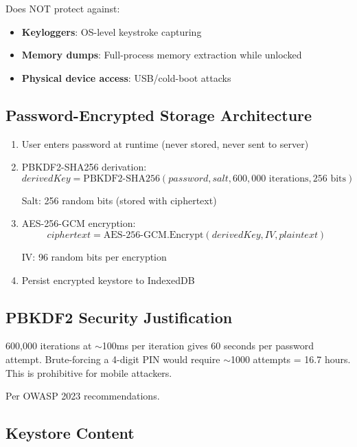 \documentclass[11pt,a4paper,oneside]{article}
\begin{document}
Does NOT protect against:
\begin{itemize}
\item \textbf{Keyloggers}: OS-level keystroke capturing
\item \textbf{Memory dumps}: Full-process memory extraction while unlocked
\item \textbf{Physical device access}: USB/cold-boot attacks
\end{itemize}

\subsection{Password-Encrypted Storage Architecture}

\begin{enumerate}
\item User enters password at runtime (never stored, never sent to server)

\item PBKDF2-SHA256 derivation:
\begin{equation}
derivedKey = \text{PBKDF2-SHA256}(password, salt, 600{,}000\text{ iterations}, 256\text{ bits})
\end{equation}

Salt: 256 random bits (stored with ciphertext)

\item AES-256-GCM encryption:
\begin{equation}
ciphertext = \text{AES-256-GCM.Encrypt}(derivedKey, IV, plaintext)
\end{equation}

IV: 96 random bits per encryption

\item Persist encrypted keystore to IndexedDB
\end{enumerate}

\subsection{PBKDF2 Security Justification}

600,000 iterations at $\sim$100ms per iteration gives 60 seconds per password attempt. Brute-forcing a 4-digit PIN would require $\sim$1000 attempts = 16.7 hours. This is prohibitive for mobile attackers.

Per OWASP 2023 recommendations.

\subsection{Keystore Content}
\end{document}
